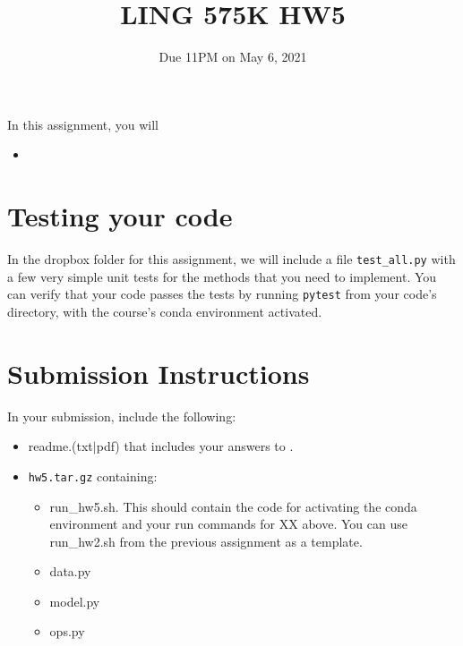 \documentclass[11pt]{article}
\begin{document}
\title{LING 575K HW5}
\date{\vspace{-0.2in}Due 11PM on May 6, 2021}
\maketitle


\noindent In this assignment, you will 
\begin{itemize}
  \item 
\end{itemize}


\section{}



\vspace{2em}


\section{Testing your code}

In the dropbox folder for this assignment, we will include a file \texttt{test\_all.py} with a few very simple unit tests for the methods that you need to implement.  You can verify that your code passes the tests by running \texttt{pytest} from your code's directory, with the course's conda environment activated.


\section*{Submission Instructions}

In your submission, include the following:
\begin{itemize}
  \item readme.(txt$\mid$pdf) that includes your answers to . 
  \item \texttt{hw5.tar.gz} containing:
  \begin{itemize}
    \item run\_hw5.sh.  This should contain the code for activating the conda environment and your run commands for XX above.  You can use run\_hw2.sh from the previous assignment as a template.
    \item data.py
    \item model.py
    \item ops.py
  \end{itemize}
\end{itemize}
\end{document}
